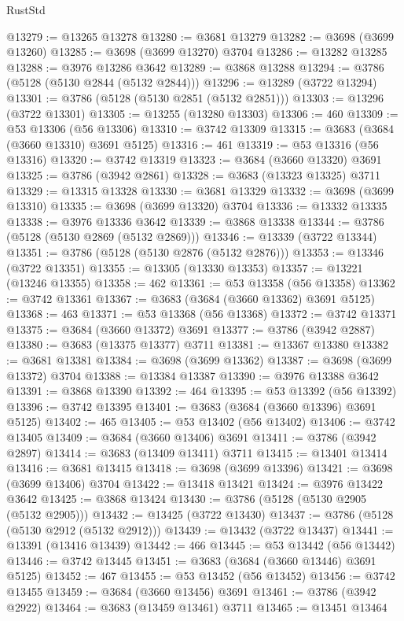\begin{lexlean}{RustStd}
\begin{coremodule}
{\begin{coremodule}
{{{{{{{{{{{{{{{{{{{{{{{{{{{{{{{{{{{{{{{{{{{{{{{@13279 := @13265 @13278
@13280 := @3681 @13279
@13282 := @3698 (@3699 @13260)
@13285 := @3698 (@3699 @13270) @3704
@13286 := @13282 @13285
@13288 := @3976 @13286 @3642
@13289 := @3868 @13288
@13294 := @3786 (@5128 (@5130 @2844 (@5132 @2844)))
@13296 := @13289 (@3722 @13294)
@13301 := @3786 (@5128 (@5130 @2851 (@5132 @2851)))
@13303 := @13296 (@3722 @13301)
@13305 := @13255 (@13280 @13303)
@13306 := 460
@13309 := @53 @13306 (@56 @13306)
@13310 := @3742 @13309
@13315 := @3683 (@3684 (@3660 @13310) @3691 @5125)
@13316 := 461
@13319 := @53 @13316 (@56 @13316)
@13320 := @3742 @13319
@13323 := @3684 (@3660 @13320) @3691
@13325 := @3786 (@3942 @2861)
@13328 := @3683 (@13323 @13325) @3711
@13329 := @13315 @13328
@13330 := @3681 @13329
@13332 := @3698 (@3699 @13310)
@13335 := @3698 (@3699 @13320) @3704
@13336 := @13332 @13335
@13338 := @3976 @13336 @3642
@13339 := @3868 @13338
@13344 := @3786 (@5128 (@5130 @2869 (@5132 @2869)))
@13346 := @13339 (@3722 @13344)
@13351 := @3786 (@5128 (@5130 @2876 (@5132 @2876)))
@13353 := @13346 (@3722 @13351)
@13355 := @13305 (@13330 @13353)
@13357 := @13221 (@13246 @13355)
@13358 := 462
@13361 := @53 @13358 (@56 @13358)
@13362 := @3742 @13361
@13367 := @3683 (@3684 (@3660 @13362) @3691 @5125)
@13368 := 463
@13371 := @53 @13368 (@56 @13368)
@13372 := @3742 @13371
@13375 := @3684 (@3660 @13372) @3691
@13377 := @3786 (@3942 @2887)
@13380 := @3683 (@13375 @13377) @3711
@13381 := @13367 @13380
@13382 := @3681 @13381
@13384 := @3698 (@3699 @13362)
@13387 := @3698 (@3699 @13372) @3704
@13388 := @13384 @13387
@13390 := @3976 @13388 @3642
@13391 := @3868 @13390
@13392 := 464
@13395 := @53 @13392 (@56 @13392)
@13396 := @3742 @13395
@13401 := @3683 (@3684 (@3660 @13396) @3691 @5125)
@13402 := 465
@13405 := @53 @13402 (@56 @13402)
@13406 := @3742 @13405
@13409 := @3684 (@3660 @13406) @3691
@13411 := @3786 (@3942 @2897)
@13414 := @3683 (@13409 @13411) @3711
@13415 := @13401 @13414
@13416 := @3681 @13415
@13418 := @3698 (@3699 @13396)
@13421 := @3698 (@3699 @13406) @3704
@13422 := @13418 @13421
@13424 := @3976 @13422 @3642
@13425 := @3868 @13424
@13430 := @3786 (@5128 (@5130 @2905 (@5132 @2905)))
@13432 := @13425 (@3722 @13430)
@13437 := @3786 (@5128 (@5130 @2912 (@5132 @2912)))
@13439 := @13432 (@3722 @13437)
@13441 := @13391 (@13416 @13439)
@13442 := 466
@13445 := @53 @13442 (@56 @13442)
@13446 := @3742 @13445
@13451 := @3683 (@3684 (@3660 @13446) @3691 @5125)
@13452 := 467
@13455 := @53 @13452 (@56 @13452)
@13456 := @3742 @13455
@13459 := @3684 (@3660 @13456) @3691
@13461 := @3786 (@3942 @2922)
@13464 := @3683 (@13459 @13461) @3711
@13465 := @13451 @13464
}}}}}}}}}}}}}}}}}}}}}}}}}}}}}}}}}}}}}}}}}}}}}}}
\end{coremodule}}
\end{coremodule}
\end{lexlean}

